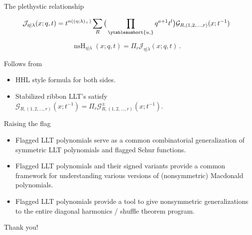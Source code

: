 \documentclass[dvipsnames]{beamer}
\newcommand{\Gcal}{{\mathcal G}}
\newcommand{\nsJ}{\mathcal{J}}
\newcommand{\nsH}{\operatorname{nsH}}
\theoremstyle{definition}
\newcounter{c}
\begin{document}
\begin{frame}{The plethystic relationship}
  \begin{theorem}
    \[
      \nsJ_{\eta|\lambda}(x;q,t) = t^{n((\eta;\lambda)_+)} \sum_R
      \big( \prod_{\ytableaushort{u,{}}} q^{a+1} t^l\big) \Gcal_{R,(1,2,\ldots,r)}(x;t^{-1})
    \]
  \end{theorem}\pause
  \begin{theorem}
  \[\nsH_{\eta|\lambda}(x;q,t) = \Pi_r \nsJ_{\eta|\lambda}(x;q,t)\,.\]
\end{theorem}\pause
Follows from
\begin{itemize}
\item HHL style formula for both sides.
\item Stabilized ribbon LLT's satisfy \(\Gcal_{R,(1,2,\ldots,r)}(x;t^{-1}) = \Pi_r
  \Gcal^\pm_{R,(1,2,\ldots,r)}(x;t^{-1})\).
\end{itemize}
\end{frame}
\begin{frame}{Raising the flag}
  \begin{itemize}
  \item Flagged LLT polynomials serve as a common combinatorial generalization of
    symmetric LLT polynomials and flagged Schur functions.\pause
  \item Flagged LLT polynomials and their signed variants provide a
    common framework for understanding various versions of
    (nonsymmetric) Macdonald polynomials.\pause
  \item Flagged LLT polynomials provide a tool to give 
    nonsymmetric generalizations to the entire diagonal harmonics /
    shuffle theorem program.\pause
  \end{itemize}
  Thank you!
\end{frame}
\end{document}
